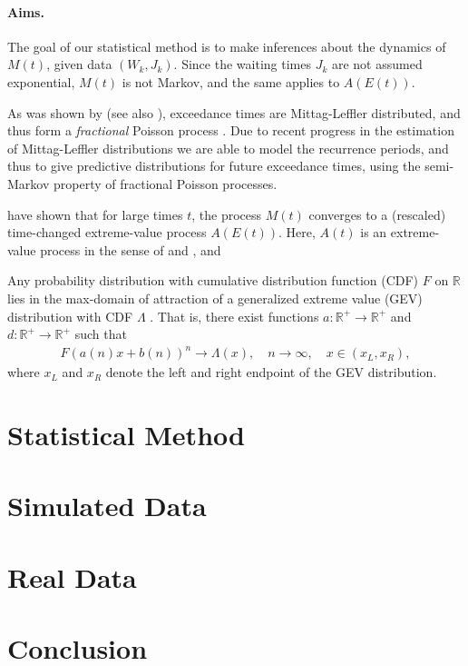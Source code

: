 \documentclass[12pt]{article}
\theoremstyle{definition}
\theoremstyle{remark}
\numberwithin{equation}{section}
\newcommand{\R}{\mathbb R}
\newcommand{\Rp}{\mathbb R^+}
\newcommand{\1}{\mathbf 1}
\begin{document}
\paragraph*{Aims.}
The goal of our statistical method is to make inferences about the dynamics
of $M(t)$, given data $(W_k, J_k)$. 
Since the waiting times $J_k$ are not assumed exponential, $M(t)$ is not Markov,
and the same applies to $A(E(t))$.  



As was shown by \cite{Anderson1987} (see also 
\cite{MeerschaertStoev08}), exceedance times are
Mittag-Leffler distributed, and thus form a \emph{fractional} Poisson process
\cite{Laskin2003}. Due to recent progress in the estimation of Mittag-Leffler
distributions \cite{Cahoy2013,Cahoy2010} we are able to model the recurrence
periods, and thus to give predictive distributions for future exceedance times,
using the semi-Markov property of fractional Poisson processes.



\cite{Meerschaert2009} have shown that for large times $t$, 
the process $M(t)$ converges to a (rescaled) time-changed 
extreme-value process $A(E(t))$. 
Here, $A(t)$ is an extreme-value process in the sense of \cite{Lamperti1964}
and \cite{resnick2013extreme}, and 









Any probability distribution with cumulative distribution
function (CDF) $F$ on $\R$ lies in the max-domain of attraction
of a generalized extreme value (GEV) distribution with CDF $\Lambda$
\cite{leadbetter2012extremes}.
That is, there exist
functions $a: \Rp \to \Rp$ and $d: \Rp \to \Rp$ such that
\begin{align}
F(a(n) x + b(n))^n \to \Lambda(x), \quad n \to \infty, \quad x \in (x_L, x_R),
\end{align}
where $x_L$ and $x_R$ denote the left and right endpoint of the GEV distribution.



\section{Statistical Method}

\section{Simulated Data}

\section{Real Data}

\section{Conclusion}




\end{document}

